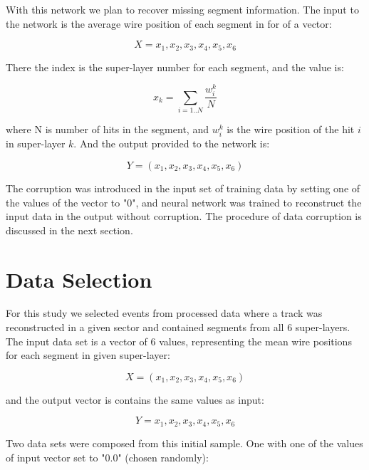 \documentclass[12pt]{article}
\begin{document}
With this network we plan to recover missing segment information. The input to the network is
the average wire position of each segment in for of a vector:

\begin{equation}
X = {x_1,x_2,x_3,x_4,x_5,x_6}
\end{equation}

There the index is the super-layer number for each segment, and the value is:

\begin{equation}
x_k = \sum_{i=1..N} \frac{w^k_i}{N}
\end{equation}

where N is number of hits in the segment, and $w^k_i$ is the wire position of the hit $i$
in super-layer $k$. And the output provided to the network is:

\begin{equation}
Y = (x_1,x_2,x_3,x_4,x_5,x_6)
\end{equation}

The corruption was introduced in the input set of training data by setting one of the values of the vector to "0",
and neural network was trained to reconstruct the input data in the output without corruption. The procedure
of data corruption is discussed in the next section.


\section{Data Selection}
\label{section:data}

\indent

For this study we selected events from processed data where a track was reconstructed in a given
sector and contained segments from all 6 super-layers. The input data set is a vector of 6 values,
representing the mean wire positions for each segment in given super-layer:

\begin{equation}
 X = (x_1,x_2,x_3,x_4,x_5,x_6)
\end{equation}

and the output vector is contains the same values as input:

\begin{equation}
Y ={x_1,x_2,x_3,x_4,x_5,x_6}
\end{equation}

Two data sets were composed from this initial sample. One with one of the values of input vector set to "0.0"
(chosen randomly):
\end{document}
